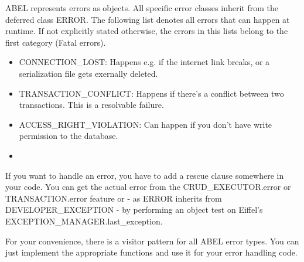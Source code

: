 ABEL represents errors as objects. 
All specific error classes inherit from the deferred class ERROR.
The following list denotes all errors that can happen at runtime. 
If not explicitly stated otherwise, the errors in this lists belong to the first category (Fatal errors).

\begin{itemize}
\item CONNECTION\_LOST: Happens e.g. if the internet link breaks, or a serialization file gets exernally deleted.
\item TRANSACTION\_CONFLICT: Happens if there's a conflict between two transactions. This is a resolvable failure.
\item ACCESS\_RIGHT\_VIOLATION: Can happen if you don't have write permission to the database.
\item {}
\end{itemize}

If you want to handle an error, you have to add a rescue clause somewhere in your code. 
You can get the actual error from the CRUD\_EXECU\-TOR.error or TRANSACTION.error feature or - as ERROR inherits from DEVELOPER\_EXCEPTION -
by performing an object test on Eiffel's EXCEPTION\_MANAGER.last\_exception.

For your convenience, there is a visitor pattern for all ABEL error types. 
You can just implement the appropriate functions and use it for your error handling code.



